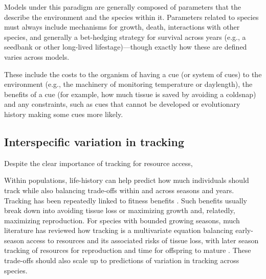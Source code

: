 \documentclass[11pt,letterpaper]{article}
\begin{document}
Models under this paradigm are generally composed of parameters that the describe the environment and the species within it. Parameters related to species must always include mechanisms for growth, death, interactions with other species, and generally a bet-hedging strategy for survival across years (e.g., a seedbank or other long-lived lifestage)---though exactly how these are defined varies across models.

These include the costs to the organism of having a cue (or system of cues) to the environment (e.g., the machinery of monitoring temperature or daylength), the benefits of a cue (for example, how much tissue is saved by avoiding a coldsnap) and any constraints, such as cues that cannot be developed or evolutionary history making some cues more likely. 

\subsection{Interspecific variation in tracking}
Despite the clear importance of tracking for resource access, 

Within populations, life-history can help predict how much individuals should track while also balancing trade-offs within and across seasons and years. Tracking has been repeatedly linked to fitness benefits \citep[e.g.,][]{farzan2018,deacy2018}. Such benefits usually break down into avoiding tissue loss or maximizing growth and, relatedly, maximizing reproduction. For species with bounded growing seasons, much literature has reviewed how tracking is a multivariate equation balancing early-season access to resources and its associated risks of tissue loss, with later season tracking of resources for reproduction and time for offspring to mature \citep{donohue2002,Morin:2005ye,Burghardt2015}. These trade-offs should also scale up to predictions of variation in tracking across species. %
\end{document}
